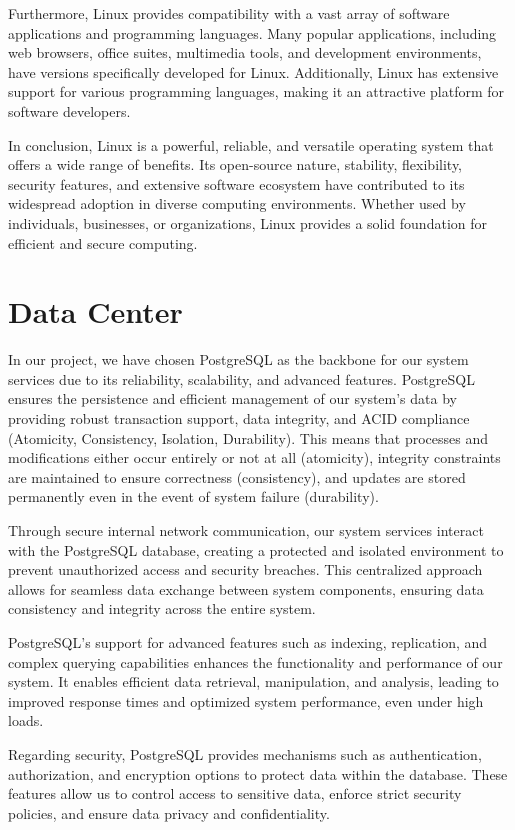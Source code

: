 \documentclass[
12pt,
oneside, 
onehalfspacing, 
nolistspacing, 
parskip, 
chapterinoneline, 
]{AASTCOMPUTER}
\begin{document}
Furthermore, Linux provides compatibility with a vast array of software applications and programming languages. Many popular applications, including web browsers, office suites, multimedia tools, and development environments, have versions specifically developed for Linux. Additionally, Linux has extensive support for various programming languages, making it an attractive platform for software developers.

In conclusion, Linux is a powerful, reliable, and versatile operating system that offers a wide range of benefits. Its open-source nature, stability, flexibility, security features, and extensive software ecosystem have contributed to its widespread adoption in diverse computing environments. Whether used by individuals, businesses, or organizations, Linux provides a solid foundation for efficient and secure computing.
\newpage
\section{Data Center}
In our project, we have chosen PostgreSQL as the backbone for our system services due to its reliability, scalability, and advanced features. PostgreSQL ensures the persistence and efficient management of our system's data by providing robust transaction support, data integrity, and ACID compliance (Atomicity, Consistency, Isolation, Durability). This means that processes and modifications either occur entirely or not at all (atomicity), integrity constraints are maintained to ensure correctness (consistency), and updates are stored permanently even in the event of system failure (durability).

Through secure internal network communication, our system services interact with the PostgreSQL database, creating a protected and isolated environment to prevent unauthorized access and security breaches. This centralized approach allows for seamless data exchange between system components, ensuring data consistency and integrity across the entire system.

PostgreSQL's support for advanced features such as indexing, replication, and complex querying capabilities enhances the functionality and performance of our system. It enables efficient data retrieval, manipulation, and analysis, leading to improved response times and optimized system performance, even under high loads.

Regarding security, PostgreSQL provides mechanisms such as authentication, authorization, and encryption options to protect data within the database. These features allow us to control access to sensitive data, enforce strict security policies, and ensure data privacy and confidentiality.
\end{document}

